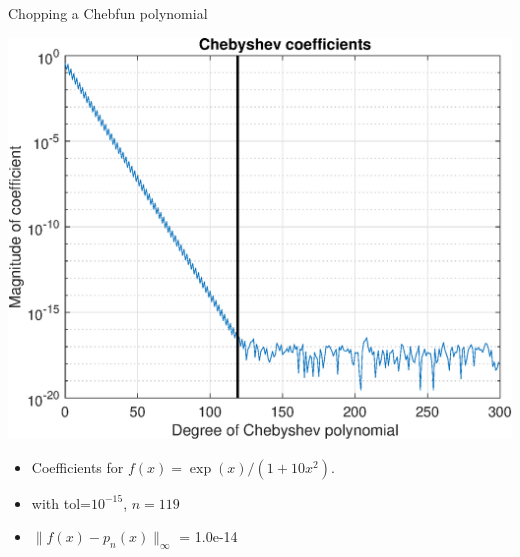 \documentclass{beamer}
\begin{document}
\begin{frame}{Chopping a Chebfun polynomial}
\begin{center}
\includegraphics[scale = 0.4]{Cheb15.eps}
\end{center}

\begin{center}
\begin{itemize}
\item \begin{center} Coefficients for $f(x)=\exp(x)/(1+10 x^2)$. \end{center}
\item \begin{center} with tol=$10^{-15}$, $n=119$ \end{center}
\item \begin{center} $\| f(x)-p_n(x) \|_{\infty}$ = 1.0e-14 \end{center}
\end{itemize} 
\end{center}
\end{frame}
\end{document}
